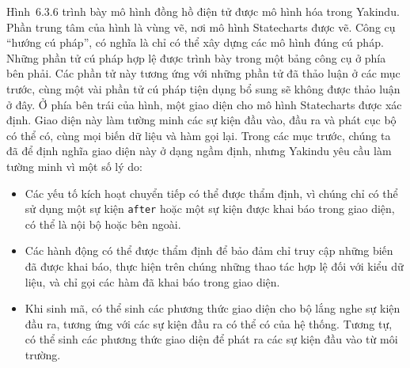 Hình~6.3.6 trình bày mô hình đồng hồ điện tử được mô hình hóa trong Yakindu. Phần trung tâm của hình là vùng vẽ, nơi mô hình Statecharts được vẽ. Công cụ ``hướng cú pháp'', có nghĩa là chỉ có thể xây dựng các mô hình đúng cú pháp. Những phần tử cú pháp hợp lệ được trình bày trong một bảng công cụ ở phía bên phải. Các phần tử này
tương ứng với những phần tử đã thảo luận ở các mục trước, cùng một vài phần tử cú pháp tiện dụng bổ sung sẽ không được thảo luận ở đây. Ở phía bên trái của hình, một giao diện cho mô hình Statecharts được xác định. Giao diện này làm tường minh các sự kiện đầu vào, đầu ra và phát cục bộ có thể có, cùng mọi biến dữ liệu và hàm gọi lại. Trong các mục trước, chúng ta đã để định nghĩa giao diện này ở dạng ngầm định, nhưng Yakindu yêu cầu làm tường minh vì một số lý do:
\begin{itemize}
\item Các yếu tố kích hoạt chuyển tiếp có thể được thẩm định, vì chúng chỉ có thể sử dụng một sự kiện \texttt{after} hoặc một sự kiện được khai báo trong giao diện, có thể là nội bộ hoặc bên ngoài.
\item Các hành động có thể được thẩm định để bảo đảm chỉ truy cập những biến đã được khai báo, thực hiện trên chúng những thao tác hợp lệ đối với kiểu dữ liệu, và chỉ gọi các hàm đã khai báo trong giao diện.
\item Khi sinh mã, có thể sinh các phương thức giao diện cho bộ lắng nghe sự kiện đầu ra, tương ứng với các sự kiện đầu ra có thể có của hệ thống. Tương tự, có thể sinh các phương thức giao diện để phát ra các sự kiện đầu vào từ môi trường.
\end{itemize}

